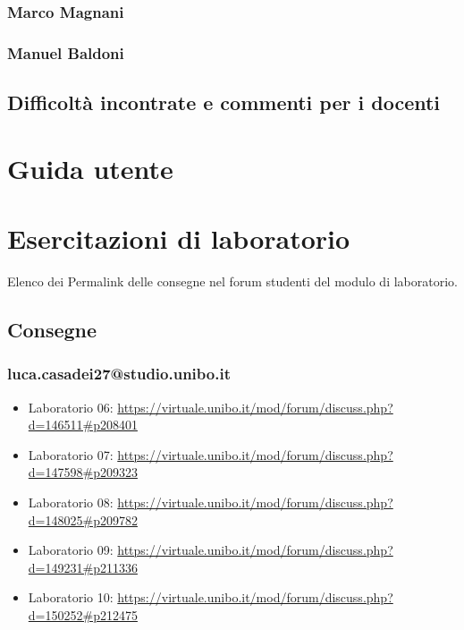 \documentclass[a4paper,12pt]{report}
\begin{document}
\subsection*{Marco Magnani}
\subsection*{Manuel Baldoni}

\section{Difficoltà incontrate e commenti per i docenti}

\appendix
\chapter{Guida utente}

\chapter{Esercitazioni di laboratorio}
Elenco dei Permalink delle consegne nel forum studenti del modulo di laboratorio.
\section*{Consegne}
\subsection{luca.casadei27@studio.unibo.it}
\begin{itemize}
	\item Laboratorio 06: \url{https://virtuale.unibo.it/mod/forum/discuss.php?d=146511#p208401}
	\item Laboratorio 07: \url{https://virtuale.unibo.it/mod/forum/discuss.php?d=147598#p209323}
	\item Laboratorio 08: \url{https://virtuale.unibo.it/mod/forum/discuss.php?d=148025#p209782}
	\item Laboratorio 09: \url{https://virtuale.unibo.it/mod/forum/discuss.php?d=149231#p211336}
	\item Laboratorio 10: \url{https://virtuale.unibo.it/mod/forum/discuss.php?d=150252#p212475}
\end{itemize}
\end{document}
